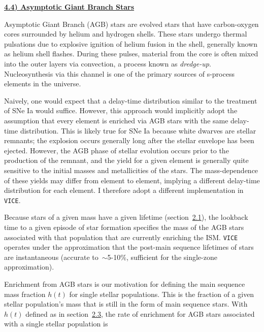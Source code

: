 \documentclass{report}
\begin{document}
\newpage 
\noindent 
\begin{center}
\hypertarget{enrichment:agb}{
	\underline{\LARGE
		\textbf{4.4) Asymptotic Giant Branch Stars}
	}
}
\end{center}
\par\noindent 
Asymptotic Giant Branch (AGB) stars are evolved stars that have carbon-oxygen 
cores surrounded by helium and hydrogen shells. These stars undergo thermal 
pulsations due to explosive ignition of helium fusion in the shell, generally 
known as helium shell flashes. During these pulses, material from the core is 
often mixed into the outer layers via convection, a process known as 
\textit{dredge-up}. Nucleosynthesis via this channel is one of the primary 
sources of s-process elements in the universe. 
\par
Naively, one would expect that a delay-time distribution similar to the 
treatment of SNe Ia would suffice. However, this approach would implicitly 
adopt the assumption that every element is enriched via AGB stars with the 
same delay-time distribution. This is likely true for SNe Ia because white 
dwarves are stellar remnants; the explosion occurs generally long after the 
stellar envelope has been ejected. However, the AGB phase of stellar evolution 
occurs prior to the production of the remnant, and the yield for a given 
element is generally quite sensitive to the initial masses and metallicities 
of the stars. The mass-dependence of these yields may differ from element 
to element, implying a different delay-time distribution for each element. 
I therefore adopt a different implementation in \texttt{VICE}. 
\par
Because stars of a given mass have a given lifetime 
(section~\hyperlink{ssp:lifetimes}{2.1}), the lookback time to a given episode 
of star formation specifies the mass of the AGB stars associated with that 
population that are currently enriching the ISM. \texttt{VICE} operates under 
the approximation that the post-main sequence lifetimes of stars are 
instantaneous (accurate to~$\sim$5-10\%, sufficient for the single-zone 
approximation). 
\par
Enrichment from AGB stars is our motivation for defining the main sequence 
mass fraction $h(t)$ for single stellar populations. This is the fraction of a 
given stellar population's mass that is still in the form of main sequence 
stars. With $h(t)$ defined as in section~\hyperlink{ssp:msmf}{2.3}, the rate 
of enrichment for AGB stars associated with a single stellar population is 
\end{document}
